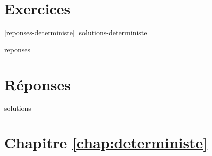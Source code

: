 \section{Exercices}
\label{sec:prov:exercices}

[reponses-deterministe]
[solutions-deterministe]

\begin{Filesave}{reponses}
\bigskip
\section*{Réponses}

\end{Filesave}

\begin{Filesave}{solutions}
\section*{Chapitre \ref*{chap:deterministe}}

\end{Filesave}

